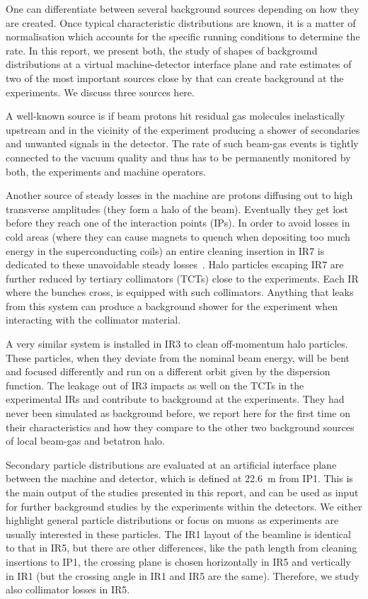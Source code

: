 One can differentiate between several background sources depending on how they are created. Once typical characteristic distributions are known, it is a matter of normalisation which accounts for the specific running conditions to determine the rate. In this report, we present both, the study of shapes of background distributions at a virtual machine-detector interface plane and rate estimates of two of the most important sources close by that can create background at the experiments. We discuss three sources here.

A well-known source is if beam protons hit residual gas molecules inelastically upstream and in the vicinity of the experiment producing a shower of secondaries and unwanted signals in the detector. The rate of such beam-gas events is tightly connected to the vacuum quality and thus has to be permanently monitored by both, the experiments and machine operators.

Another source of steady losses in the machine are protons diffusing out to high transverse amplitudes (they form a halo of the beam). Eventually they get lost before they reach one of the interaction points (IPs). In order to avoid losses in cold areas (where they can cause magnets to quench when depositing too much energy in the superconducting coils) an entire cleaning insertion in IR7 is dedicated to these unavoidable steady losses~\cite{LHCDesignRep,assmann05chamonix}. Halo particles escaping IR7 are further reduced by tertiary collimators (TCTs) close to the experiments. Each IR where the bunches cross, is equipped with such collimators. Anything that leaks from this system can produce a background shower for the experiment when interacting with the collimator material. 

A very similar system is installed in IR3 to clean off-momentum halo particles. These particles, when they deviate from the nominal beam energy, will be bent and focused differently and run on a different orbit given by the dispersion function. The leakage out of IR3 impacts as well on the TCTs in the experimental IRs and contribute to background at the experiments. They had never been simulated as background before, we report here for the first time on their characteristics and how they compare to the other two background sources of local beam-gas and betatron halo. 

Secondary particle distributions are evaluated at an artificial interface plane between the machine and detector, which is defined at 22.6~m from IP1. This is the main output of the studies presented in this report, and can be used as input for further background studies by the experiments within the detectors. We either highlight general particle distributions or focus on muons as experiments are usually interested in these particles. The IR1 layout of the beamline is identical to that in IR5, but there are other differences, like the path length from cleaning insertions to IP1, the crossing plane is chosen horizontally in IR5 and vertically in IR1 (but the crossing angle in IR1 and IR5 are the same). Therefore, we study also collimator losses in IR5.

